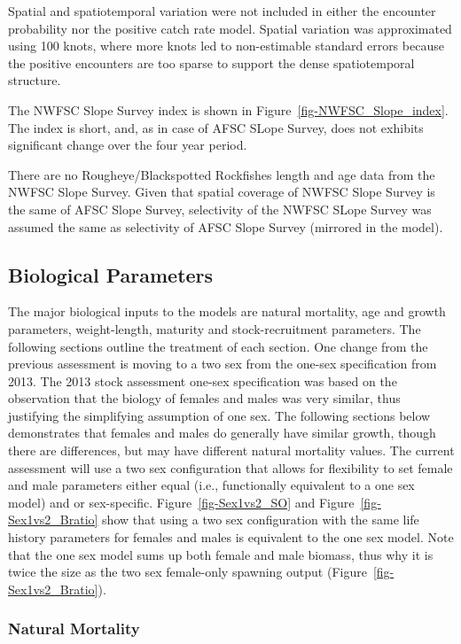 \documentclass[
]{scrartcl}
\begin{document}
Spatial and spatiotemporal variation were not included in either the
encounter probability nor the positive catch rate model. Spatial
variation was approximated using 100 knots, where more knots led to
non-estimable standard errors because the positive encounters are too
sparse to support the dense spatiotemporal structure.

The NWFSC Slope Survey index is shown in
Figure~\ref{fig-NWFSC_Slope_index}. The index is short, and, as in case
of AFSC SLope Survey, does not exhibits significant change over the four
year period.

There are no Rougheye/Blackspotted Rockfishes length and age data from
the NWFSC Slope Survey. Given that spatial coverage of NWFSC Slope
Survey is the same of AFSC Slope Survey, selectivity of the NWFSC SLope
Survey was assumed the same as selectivity of AFSC Slope Survey
(mirrored in the model).

\subsection{Biological Parameters}\label{biological-parameters}

The major biological inputs to the models are natural mortality, age and
growth parameters, weight-length, maturity and stock-recruitment
parameters. The following sections outline the treatment of each
section. One change from the previous assessment is moving to a two sex
from the one-sex specification from 2013. The 2013 stock assessment
one-sex specification was based on the observation that the biology of
females and males was very similar, thus justifying the simplifying
assumption of one sex. The following sections below demonstrates that
females and males do generally have similar growth, though there are
differences, but may have different natural mortality values. The
current assessment will use a two sex configuration that allows for
flexibility to set female and male parameters either equal (i.e.,
functionally equivalent to a one sex model) and or sex-specific.
Figure~\ref{fig-Sex1vs2_SO} and Figure~\ref{fig-Sex1vs2_Bratio} show
that using a two sex configuration with the same life history parameters
for females and males is equivalent to the one sex model. Note that the
one sex model sums up both female and male biomass, thus why it is twice
the size as the two sex female-only spawning output
(Figure~\ref{fig-Sex1vs2_Bratio}).

\subsubsection{Natural Mortality}\label{natural-mortality}
\end{document}
